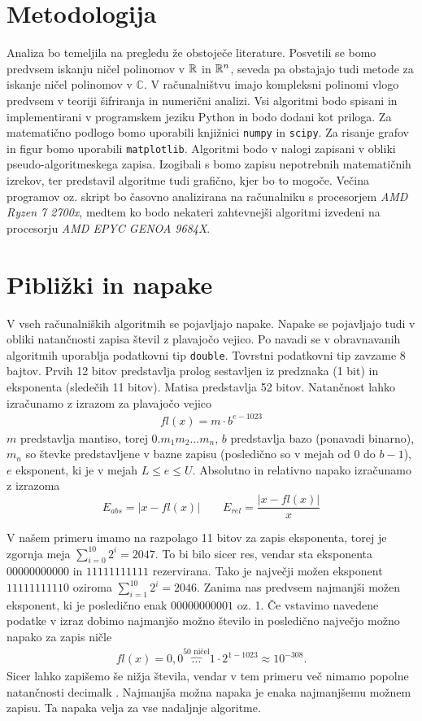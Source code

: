 \section{Metodologija}
Analiza bo temeljila na pregledu že obstoječe literature. Posvetili se bomo predvsem iskanju ničel polinomov v $\mathbb{R}$ in $\mathbb{R}^n$, seveda pa obstajajo tudi metode za iskanje ničel polinomov v $\mathbb{C}$. V računalništvu imajo kompleksni polinomi vlogo predvsem v teoriji šifriranja in numerični analizi. Vsi algoritmi bodo spisani in implementirani v programskem jeziku Python in bodo dodani kot priloga. Za matematično podlogo bomo uporabili knjižnici \texttt{numpy} in \texttt{scipy}. Za risanje grafov in figur bomo uporabili \texttt{matplotlib}. Algoritmi bodo v nalogi zapisani v obliki pseudo-algoritmeskega zapisa. Izogibali s bomo zapisu nepotrebnih matematičnih izrekov, ter predstavil algoritme tudi grafično, kjer bo to mogoče. Večina programov oz. skript bo časovno analizirana na računalniku s procesorjem \textit{AMD Ryzen 7 2700x}, medtem ko bodo nekateri zahtevnejši algoritmi izvedeni na procesorju \textit{AMD EPYC GENOA 9684X}.

\newpage
\section{Pibližki in napake}
V vseh računalniških algoritmih se pojavljajo napake. Napake se pojavljajo tudi v obliki natančnosti zapisa števil z plavajočo vejico. Po navadi se v obravnavanih algoritmih uporablja podatkovni tip \texttt{double}. Tovrstni podatkovni tip zavzame 8 bajtov. Prvih 12 bitov predstavlja prolog sestavljen iz predznaka (1 bit) in eksponenta (sledečih 11 bitov). Matisa predstavlja 52 bitov. Natančnost lahko izračunamo z izrazom za plavajočo vejico \cite{Ridgway2011}
\begin{align}
    fl(x) = m \cdot b^{e-1023}
\end{align}
$m$ predstavlja mantiso, torej $0.m_1m_2...m_n$, $b$ predstavlja bazo (ponavadi binarno),  $m_n$ so števke predstavljene v bazne zapisu (posledično so v mejah od 0 do $b-1$), $e$ eksponent, ki je v mejah $L \le e \le U$. Absolutno in relativno napako izračunamo z izrazoma
\[
 E_{abs} = |x - fl(x)| \qquad E_{rel} = \frac{|x - fl(x)|}{x}
\]

V našem primeru imamo na razpolago 11 bitov za zapis eksponenta, torej je zgornja meja $\sum_{i=0}^{10} 2^i = 2047$. To bi bilo sicer res, vendar sta eksponenta $00000000000$ in $11111111111$ \cite{8766229} rezervirana. Tako je največji možen eksponent $11111111110$ oziroma $\sum_{i=1}^{10} 2^i = 2046$. Zanima nas predvsem najmanjši možen eksponent, ki je posledično enak $00000000001$ oz. 1. Če vstavimo navedene podatke v izraz dobimo najmanjšo možno število in posledično največjo možno napako za zapis ničle
\begin{align}
    fl(x) = 0,0\overbrace{...}^{\text{50 ničel}}1\cdot 2^{1-1023} \approx 10^{-308}.
\end{align}
Sicer lahko zapišemo še nižja števila, vendar v tem primeru več nimamo popolne natančnosti decimalk \cite{quadiblocFloatingPointFormats}. Najmanjša možna napaka je enaka najmanjšemu možnem zapisu. Ta napaka velja za vse nadaljnje algoritme.